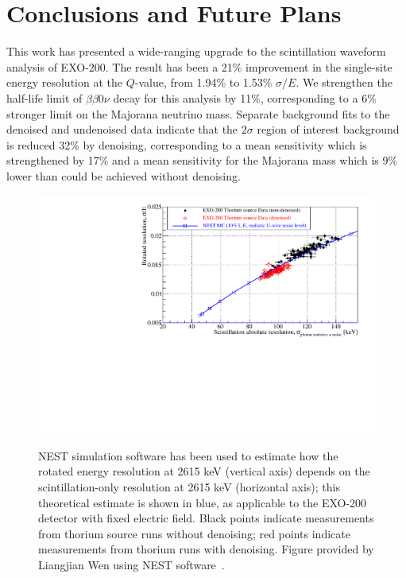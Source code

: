\renewcommand{\thechapter}{8}
\chapter{Conclusions and Future Plans}
\label{ch:Conclusions}

This work has presented a wide-ranging upgrade to the scintillation waveform analysis of EXO-200.  The result has been a 21\% improvement in the single-site energy resolution at the $Q$-value, from 1.94\% to 1.53\% $\sigma/E$.  We strengthen the half-life limit of $\beta\beta 0\nu$ decay for this analysis by 11\%, corresponding to a 6\% stronger limit on the Majorana neutrino mass.  Separate background fits to the denoised and undenoised data indicate that the $2\sigma$ region of interest background is reduced 32\% by denoising, corresponding to a mean sensitivity which is strengthened by 17\% and a mean sensitivity for the Majorana mass which is 9\% lower than could be achieved without denoising.

\begin{figure}
\begin{center}
\includegraphics[keepaspectratio=true,width=\textwidth]{resoDataMC_800eRMSInIonization_Comp.pdf}
\end{center}
\renewcommand{\baselinestretch}{1}
\small\normalsize
\begin{quote}
\caption{NEST simulation software has been used to estimate how the rotated energy resolution at 2615 keV (vertical axis) depends on the scintillation-only resolution at 2615 keV (horizontal axis); this theoretical estimate is shown in blue, as applicable to the EXO-200 detector with fixed electric field.  Black points indicate measurements from thorium source runs without denoising; red points indicate measurements from thorium runs with denoising.  Figure provided by Liangjian Wen using NEST software~\cite{NESTpaper}.}
\label{fig:ScintillationVsOverallResolution_NEST}
\end{quote}
\end{figure}
\renewcommand{\baselinestretch}{2}
\small\normalsize

